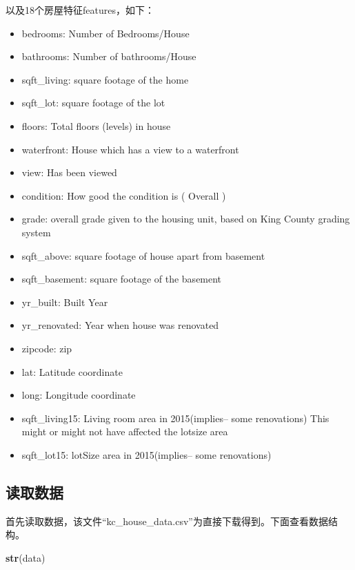 \documentclass[]{article}
\newenvironment{Shaded}{\begin{snugshade}}{\end{snugshade}}
\newcommand{\KeywordTok}[1]{\textcolor[rgb]{0.13,0.29,0.53}{\textbf{#1}}}
\newcommand{\NormalTok}[1]{#1}
\providecommand{\tightlist}{%
  \setlength{\itemsep}{0pt}\setlength{\parskip}{0pt}}
\begin{document}
以及18个房屋特征features，如下：

\begin{itemize}
\tightlist
\item
  bedrooms: Number of Bedrooms/House
\item
  bathrooms: Number of bathrooms/House
\item
  sqft\_living: square footage of the home
\item
  sqft\_lot: square footage of the lot
\item
  floors: Total floors (levels) in house
\item
  waterfront: House which has a view to a waterfront
\item
  view: Has been viewed
\item
  condition: How good the condition is ( Overall )
\item
  grade: overall grade given to the housing unit, based on King County
  grading system
\item
  sqft\_above: square footage of house apart from basement
\item
  sqft\_basement: square footage of the basement
\item
  yr\_built: Built Year
\item
  yr\_renovated: Year when house was renovated
\item
  zipcode: zip
\item
  lat: Latitude coordinate
\item
  long: Longitude coordinate
\item
  sqft\_living15: Living room area in 2015(implies-- some renovations)
  This might or might not have affected the lotsize area
\item
  sqft\_lot15: lotSize area in 2015(implies-- some renovations)
\end{itemize}







%
\subsection{读取数据}

首先读取数据，该文件``kc\_house\_data.csv''为直接下载得到。下面查看数据结构。

\begin{Shaded}
\begin{Highlighting}[]
\KeywordTok{str}\NormalTok{(data)}
\end{Highlighting}
\end{Shaded}
\end{document}
